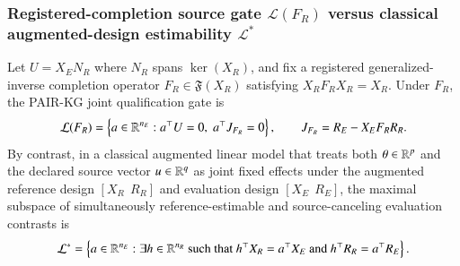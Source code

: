 \documentclass[11pt]{article}
\begin{document}
\subsubsection{Registered-completion source gate $\mathcal{L}(F_R)$ versus classical augmented-design estimability $\mathcal{L}^*$}
\label{supp:registered-vs-augmented}
Let $U = X_E N_R$ where $N_R$ spans $\ker(X_R)$, and fix a registered generalized-inverse completion operator $F_R \in \mathfrak{F}(X_R)$ satisfying $X_R F_R X_R = X_R$. Under $F_R$, the PAIR-KG joint qualification gate is
\[
\mathcal{L}(F_R) = \left\{ a \in \mathbb{R}^{n_E} : a^\top U = 0,\; a^\top J_{F_R} = 0 \right\}, \qquad J_{F_R} = R_E - X_E F_R R_R.
\]
By contrast, in a classical augmented linear model that treats both $\theta \in \mathbb{R}^p$ and the declared source vector $u \in \mathbb{R}^q$ as joint fixed effects under the augmented reference design $[X_R\ \ R_R]$ and evaluation design $[X_E\ \ R_E]$, the maximal subspace of simultaneously reference-estimable and source-canceling evaluation contrasts is
\[
\mathcal{L}^* = \left\{ a \in \R^{n_E} : \exists h \in \R^{n_R}\ \text{such that}\ h^\top X_R = a^\top X_E\ \text{and}\ h^\top R_R = a^\top R_E \right\}.
\]
\end{document}

